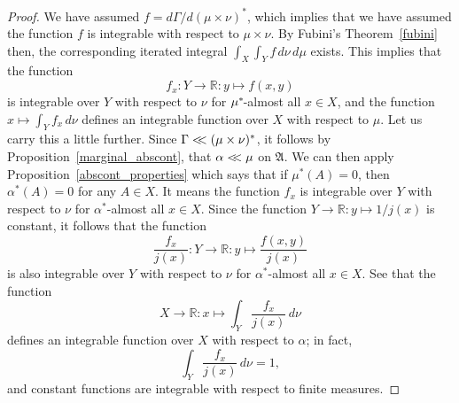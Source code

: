 \documentclass[
twoside=true,
paper=letter,
fontsize=9pt,
pagesize=auto,
leqno,
openany,
headsepline,
overfullrule,
]{scrbook}
\theoremstyle{plain}
\theoremstyle{plain}
\theoremstyle{definition}
\theoremstyle{bfnoteitalic}
\theoremstyle{bfnoteroman}
\newcommand{\sigalg}[1]{\mathfrak{#1}}
\newcommand{\R}{\mathbb{R}}
\newcommand{\sigmaalgebra}{\sigalg{A}}
\newcommand{\kernast}{\ast\kern-1pt}
\newcommand{\funcf}{f}
\newcommand{\funcj}{j}
\newcommand{\function}{f}
\newcommand{\measurespace}{X}
\newcommand{\measurespaceii}{Y}
\newcommand{\mspaceelt}{x}
\newcommand{\mspaceeltii}{y}
\newcommand{\abscont}{\mathrel{< \kern-3.5pt <}}
\newcommand{\measure}{\mu}
\newcommand{\measureii}{\nu}
\newcommand{\seti}{A}
\newcommand{\measonprod}{\Gamma}%
\newcommand{\marginalone}{\alpha}%
\begin{document}
\begin{proof}
We have assumed
$\function = d\measonprod / d(\measure\times\measureii)^*$,
which implies that we have assumed the function $\function$ is integrable with respect to 
$\measure\times\measureii$.
By Fubini's Theorem~\ref{fubini} then, the corresponding iterated integral
$\int_\measurespace\int_\measurespaceii \funcf \,d\measureii\,d\measure$
exists.
This implies that the function 
\[
\function_\mspaceelt:\measurespaceii\to\R :
\mspaceeltii\mapsto\function(\mspaceelt,\mspaceeltii)
\]
is integrable over $\measurespaceii$ with respect to $\measureii$ for 
$\measure^\kernast$-almost all 
$\mspaceelt\in\measurespace$,
and the function 
$\mspaceelt\mapsto 
\int_\measurespaceii \function_\mspaceelt \, d\measureii$ 
defines an integrable function over $\measurespace$ with respect to $\measure$.
Let us carry this
a little further.  
Since $\measonprod \abscont (\measure\times\measureii)^*$, it follows by Proposition~\ref{marginal_abscont}, that 
$\marginalone\abscont\measure$ on $\sigmaalgebra$.
We can then apply Proposition~\ref{abscont_properties} which says that if
$\measure^*(\seti)=0$, then $\marginalone^*(\seti)=0$ for any $\seti\in\measurespace$.
It means the function 
$\function_\mspaceelt$ 
is integrable over $\measurespaceii$ with respect to $\measureii$ for 
$\marginalone^*$-almost all $\mspaceelt\in\measurespace$.
Since the function
$\measurespaceii\to\R:\mspaceeltii\mapsto 1/ \funcj(\mspaceelt)$ 
is  constant, it follows that the function
\[
\frac{\function_\mspaceelt}{\funcj(\mspaceelt)} :
\measurespaceii\to\R :
\mspaceeltii\mapsto
\frac{\function(\mspaceelt,\mspaceeltii)}{\funcj(\mspaceelt)}
\]
is also integrable over $\measurespaceii$ with respect to $\measureii$ for 
$\marginalone^*$-almost all $\mspaceelt\in\measurespace$.
See that the function
\[
\measurespace\to\R :
\mspaceelt \mapsto 
\int_\measurespaceii 
\frac{\function_\mspaceelt}{\funcj(\mspaceelt)} 
\, d\measureii
\]
defines an integrable function over $\measurespace$ with respect to 
$\marginalone$; in fact,
\[
\int_\measurespaceii 
\frac{\function_\mspaceelt}{\funcj(\mspaceelt)} 
\, d\measureii
= 1,
\]
and constant functions are integrable with respect to finite measures.


\end{proof}
\end{document}
